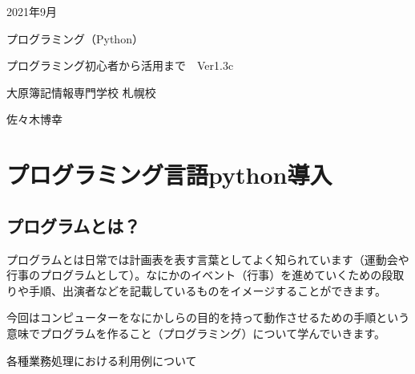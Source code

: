 \documentclass[11pt,a4paper,dvipdfmx,titlepage]{jsreport}
\begin{document}
\begin{center}
  \huge 2021年9月　\par
  \vspace{15mm}
  \huge プログラミング（Python） \par
  \vspace{15mm}
  \LARGE  プログラミング初心者から活用まで　Ver1.3c\par
  \vspace{100mm}
\end{center}
 
\begin{flushright}
 \Large 大原簿記情報専門学校 札幌校 \par
  \vspace{15mm}
  \Large 佐々木博幸 \par
  \vspace{10mm}
\end{flushright}
\thispagestyle{empty}
\clearpage
\addtocounter{page}{-1}
\newpage

\tableofcontents
\printindex
\chapter{プログラミング言語python導入}

\section{プログラムとは？}
プログラムとは日常では計画表を表す言葉としてよく知られています（運動会や行事のプログラムとして）。なにかのイベント（行事）を進めていくための段取りや手順、出演者などを記載しているものをイメージすることができます。



今回はコンピューターをなにかしらの目的を持って動作させるための手順という意味でプログラムを作ること（プログラミング）について学んでいきます。


各種業務処理における利用例について
\end{document}
